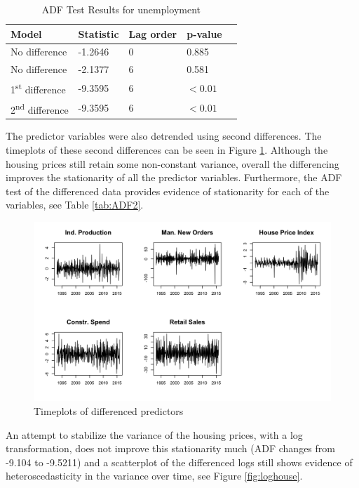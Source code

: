 \documentclass[twoside,twocolumn]{article}
\begin{document}
		 \begin{table}[htb]
		 \centering
		 \caption{ADF Test Results for unemployment}
		 \label{tab:ADF}
		 \begin{tabular}{lllll}
		 \hline
		 \textbf{Model} 								& \textbf{Statistic} & \textbf{Lag order} 	& \textbf{p-value}\\ \hline
		 No  difference 								&   -1.2646 				& 0 								& 0.885\\
		 No  difference 								&   -2.1377 				& 6 								& 0.581\\
		 1\textsuperscript{st} difference 	&  -9.3595 				& 6 								&\( < 0.01\)\\
		 2\textsuperscript{nd} difference 	&  -9.3595 				& 6 								& \( < 0.01\)\\	 \hline
		 \end{tabular}
		 \end{table}
The predictor variables were also detrended using second differences. The timeplots of these second differences can be seen in Figure \ref{fig:statpred}. Although the housing prices still retain some non-constant variance, overall the differencing improves the stationarity of all the predictor variables.  Furthermore, the ADF test of the differenced data provides evidence of stationarity for each of the variables, see Table \ref{tab:ADF2}.

		\begin{figure}[htb]
		\centering
		\caption{Timeplots of differenced predictors}
		\label{fig:statpred}
		\includegraphics[width=\linewidth]{images/StationaryPred}
		\end{figure}

An attempt to stabilize the variance of the housing prices, with a log transformation, does not improve this stationarity much (ADF changes from -9.104 to -9.5211) and a scatterplot of the differenced logs still shows evidence of heteroscedasticity in the variance over time, see Figure \ref{fig:loghouse}.
\end{document}
